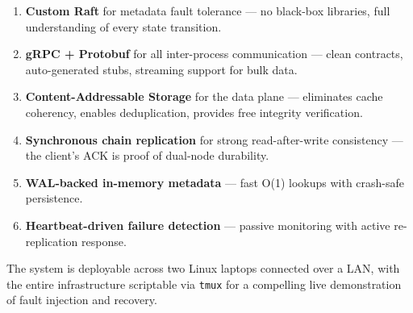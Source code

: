 \documentclass[12pt,a4paper]{article}
\begin{document}
\begin{enumerate}[leftmargin=2em]
  \item \textbf{Custom Raft} for metadata fault tolerance — no black-box libraries, full understanding of every state transition.
  \item \textbf{gRPC + Protobuf} for all inter-process communication — clean contracts, auto-generated stubs, streaming support for bulk data.
  \item \textbf{Content-Addressable Storage} for the data plane — eliminates cache coherency, enables deduplication, provides free integrity verification.
  \item \textbf{Synchronous chain replication} for strong read-after-write consistency — the client's ACK is proof of dual-node durability.
  \item \textbf{WAL-backed in-memory metadata} — fast O(1) lookups with crash-safe persistence.
  \item \textbf{Heartbeat-driven failure detection} — passive monitoring with active re-replication response.
\end{enumerate}

The system is deployable across two Linux laptops connected over a LAN, with the entire infrastructure scriptable via \texttt{tmux} for a compelling live demonstration of fault injection and recovery.
\end{document}
